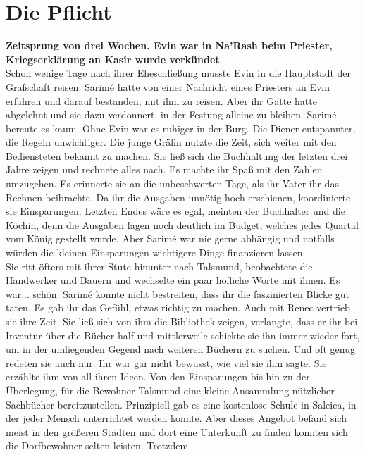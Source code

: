 
\chapter{Die Pflicht}

\textbf{Zeitsprung von drei Wochen. Evin war in Na'Rash beim Priester, Kriegserklärung an Kasir 
wurde verkündet}\\

Schon wenige Tage nach ihrer Eheschließung musste Evin in die Hauptstadt der Grafschaft reisen. 
Sarimé hatte von einer Nachricht eines Priesters an Evin erfahren und darauf bestanden, mit ihm zu 
reisen. Aber ihr Gatte hatte abgelehnt und sie dazu verdonnert, in der Festung alleine zu bleiben. 
Sarimé bereute es kaum. Ohne Evin war es ruhiger in der Burg. Die Diener entspannter, die Regeln 
unwichtiger. Die junge Gräfin nutzte die Zeit, sich weiter mit den Bediensteten bekannt zu machen. 
Sie ließ sich die Buchhaltung der letzten drei Jahre zeigen und rechnete alles nach. Es machte ihr 
Spaß mit den Zahlen umzugehen. Es erinnerte sie an die unbeschwerten Tage, als ihr Vater ihr das 
Rechnen beibrachte. Da ihr die Ausgaben unnötig hoch erschienen, koordinierte sie Einsparungen. 
Letzten Endes wäre es egal, meinten der Buchhalter und die Köchin, denn die Ausgaben lagen noch 
deutlich im Budget, welches jedes Quartal vom König gestellt wurde. Aber Sarimé war nie gerne 
abhängig und notfalls würden die kleinen Einsparungen wichtigere Dinge finanzieren lassen. \\
Sie ritt öfters mit ihrer Stute hinunter nach Talsmund, beobachtete die Handwerker und 
Bauern und wechselte ein paar höfliche Worte mit ihnen. Es war... schön. Sarimé konnte nicht 
bestreiten, dass ihr die faszinierten Blicke gut taten. Es gab ihr das Gefühl, etwas richtig zu 
machen. Auch mit Renec vertrieb sie ihre Zeit. Sie ließ sich von ihm die Bibliothek zeigen, 
verlangte, dass er ihr bei Inventur über die Bücher half und mittlerweile schickte sie ihn immer 
wieder fort, um in der umliegenden Gegend nach weiteren Büchern zu suchen. Und oft genug redeten sie 
auch nur. Ihr war gar nicht bewusst, wie viel sie ihm sagte. Sie erzählte ihm von all ihren Ideen. 
Von den Einsparungen bis hin zu der Überlegung, für die Bewohner Talsmund eine kleine Ansammlung 
nützlicher Sachbücher bereitzustellen. Prinzipiell gab es eine kostenlose Schule in Saleica, in der 
jeder Mensch unterrichtet werden konnte. Aber dieses Angebot befand sich meist in den größeren 
Städten und dort eine Unterkunft zu finden konnten sich die Dorfbewohner selten leisten. Trotzdem 
